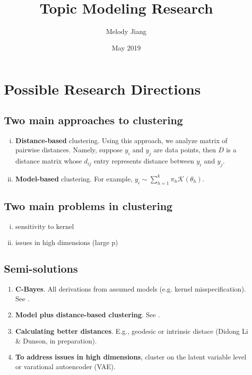 \documentclass{article}
\title{Topic Modeling Research}
\author{Melody Jiang}
\date{May 2019}
\begin{document}
\maketitle



\section{Possible Research Directions}


\subsection{Two main approaches to clustering}

\begin{enumerate}[(i)]
  \item \textbf{Distance-based} clustering. Using this approach, we analyze matrix of pairwise distances. Namely, suppose $y_i$ and $y_j$ are data points, then $D$ is a distance matrix whose $d_{ij}$ entry represents distance between $y_i$ and $y_j$.
  \item \textbf{Model-based} clustering. For example, $y_i \sim \sum_{h = 1}^k \pi_h \mathcal{K}(\theta_h)$.
\end{enumerate}


\subsection{Two main problems in clustering}

\begin{enumerate}[(i)]
  \item sensitivity to kernel
  \item issues in high dimensions (large p)
\end{enumerate}


\subsection{Semi-solutions}

\begin{enumerate}
  \item \textbf{C-Bayes}. All derivations from assumed models (e.g. kernel misspecification). See \cite{miller2018robust}.
  \item \textbf{Model plus distance-based clustering}.
  See \cite{duan2018bayesian}.
  \item \textbf{Calculating better distances}. E.g., geodesic or intrinsic distace (Didong Li \& Dunson, in preparation).
  \item \textbf{To address issues in high dimensions}, cluster on the latent variable level or varational autoencoder (VAE). 
\end{enumerate}
\end{document}
